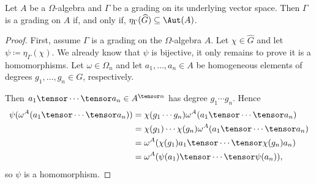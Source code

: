 


\begin{prop}
	Let $A$ be a $\Omega$-algebra and $\Gamma$ be a grading on its underlying vector space.
	Then $\Gamma$ is a grading on $A$ if, and only if, $\eta_\Gamma(\widehat G) \subseteq \Aut(A)$.
\end{prop}

\begin{proof}
	First, assume $\Gamma$ is a grading on the $\Omega$-algebra $A$.
	Let $\chi \in \widehat G$ and let $\psi \coloneqq \eta_\Gamma(\chi)$.
	We already know that $\psi$ is bijective, it only remains to prove it is a homomorphisms.
	Let $\omega \in \Omega_n$ and let $a_1, \ldots, a_n \in A$ be homogeneous elements of degrees $g_1, \ldots, g_n \in G$, respectively.

	Then $a_1\tensor \cdots \tensor a_n \in A^{\tensor n}$ has degree $g_1 \cdots g_n$. Hence
	\begin{align*}
		\psi(\omega^A(a_1\tensor \cdots \tensor a_n)) & = \chi(g_1 \cdots g_n) \omega^A(a_1\tensor \cdots \tensor a_n)      \\
		                                              & =\chi(g_1) \cdots \chi(g_n) \omega^A(a_1\tensor \cdots \tensor a_n) \\
		                                              & = \omega^A(\chi(g_1)a_1\tensor \cdots \tensor \chi(g_n)a_n)         \\
		                                              & = \omega^A(\psi(a_1)\tensor \cdots \tensor \psi(a_n)),
	\end{align*}
	so $\psi$ is a homomorphism.
\end{proof}



